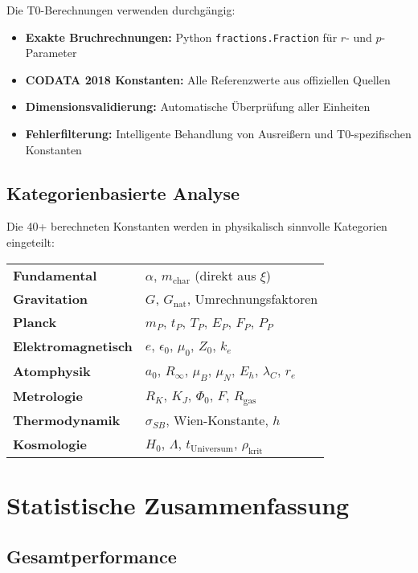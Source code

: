 \documentclass[11pt,a4paper]{article}
\begin{document}
	Die T0-Berechnungen verwenden durchgängig:
	
	\begin{itemize}
		\item \textbf{Exakte Bruchrechnungen:} Python \texttt{fractions.Fraction} für $r$- und $p$-Parameter
		\item \textbf{CODATA 2018 Konstanten:} Alle Referenzwerte aus offiziellen Quellen
		\item \textbf{Dimensionsvalidierung:} Automatische Überprüfung aller Einheiten
		\item \textbf{Fehlerfilterung:} Intelligente Behandlung von Ausreißern und T0-spezifischen Konstanten
	\end{itemize}
	
	\subsection{Kategorienbasierte Analyse}
	
	Die 40+ berechneten Konstanten werden in physikalisch sinnvolle Kategorien eingeteilt:
	
	\begin{center}
		\begin{tabular}{ll}
			\textbf{Fundamental} & $\alpha$, $m_{\text{char}}$ (direkt aus $\xi$) \\
			\textbf{Gravitation} & $G$, $G_{\text{nat}}$, Umrechnungsfaktoren \\
			\textbf{Planck} & $m_P$, $t_P$, $T_P$, $E_P$, $F_P$, $P_P$ \\
			\textbf{Elektromagnetisch} & $e$, $\epsilon_0$, $\mu_0$, $Z_0$, $k_e$ \\
			\textbf{Atomphysik} & $a_0$, $R_\infty$, $\mu_B$, $\mu_N$, $E_h$, $\lambda_C$, $r_e$ \\
			\textbf{Metrologie} & $R_K$, $K_J$, $\Phi_0$, $F$, $R_{\text{gas}}$ \\
			\textbf{Thermodynamik} & $\sigma_{SB}$, Wien-Konstante, $h$ \\
			\textbf{Kosmologie} & $H_0$, $\Lambda$, $t_{\text{Universum}}$, $\rho_{\text{krit}}$ \\
		\end{tabular}
	\end{center}
	
	\section{Statistische Zusammenfassung}
	
	\subsection{Gesamtperformance}
	
\end{document}
